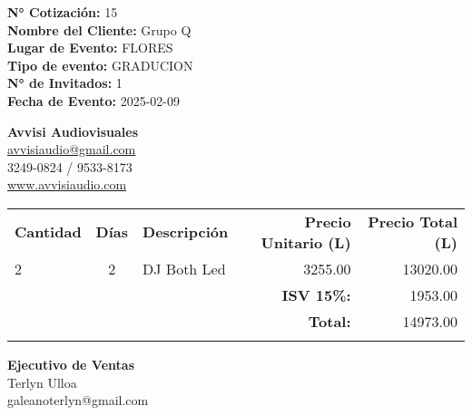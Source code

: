\documentclass[a4paper,12pt]{article}
\begin{document}
\vspace*{1.5cm}
\noindent

\noindent
\textbf{N° Cotización:} 15 \\
\textbf{Nombre del Cliente:} Grupo Q\\
\textbf{Lugar de Evento:} FLORES \\
\textbf{Tipo de evento:} GRADUCION \\
\textbf{N° de Invitados:} 1\\
\textbf{Fecha de Evento:} 2025{-}02{-}09
\begin{flushright}
\vspace{-3.5cm}
\textbf{Avvisi Audiovisuales}\\
\href{mailto:avvisiaudio@gmail.com}{avvisiaudio@gmail.com} \\
3249-0824 / 9533-8173 \\
\href{https://avvisiaudio.com}{www.avvisiaudio.com} 
\end{flushright}
\vspace{1cm}


\noindent 
\begin{table}[h!]
    \centering
    \renewcommand{\arraystretch}{1.3} %
    \begin{tabular}{
            l
            c
            p{12cm}
            r
            r
        }
        \arrayrulecolor{primary}\hline
        \textbf{Cantidad} & \textbf{Días} & \textbf{Descripción} & \textbf{Precio Unitario (L)} & \textbf{Precio Total (L)} \\
        \arrayrulecolor{primary}\hline

        2 & 2 & DJ Both Led & 3255.00 & 13020.00 \\
     
        \arrayrulecolor{primary}\hline
        & & & \textbf{ISV 15\%:} & 1953.00 \\
        & & & \textbf{Total:} & \multicolumn{1}{r}{14973.00} \\
        \arrayrulecolor{primary}
    \end{tabular}
    \label{tab-productos-cotizados}
\end{table}

\vspace{0.4cm}
\noindent\begin{minipage}[t]{0.6\textwidth}
    \textbf{Ejecutivo de Ventas} \\
    \textbf{} Terlyn Ulloa\\
    \textbf{} galeanoterlyn@gmail.com\\
\end{minipage}%
\end{document}
